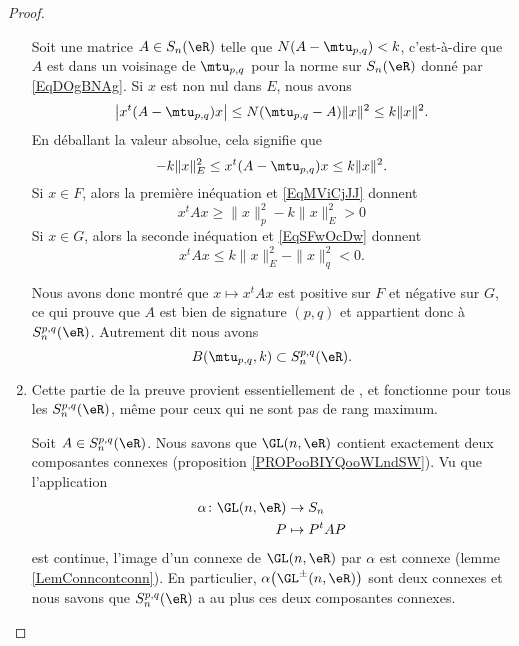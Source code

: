 \begin{proof}
\begin{enumerate}
		      Soit une matrice \( A\in S_n(\eR)\) telle que \( N(A-\mtu_{p,q})<k\), c'est-à-dire que \( A\) est dans un voisinage de \( \mtu_{p,q}\) pour la norme sur \( S_n(\eR)\) donné par \eqref{EqDOgBNAg}. Si \( x\) est non nul dans \( E\), nous avons
		      \begin{equation}
			      \big| x^t(A-\mtu_{p,q})x \big|\leq N(\mtu_{p,q}-A)\| x \|^2\leq k\| x \|^2.
		      \end{equation}
		      En déballant la valeur absolue, cela signifie que
		      \begin{equation}
			      -k\| x \|_E^2\leq x^t(A-\mtu_{p,q})x\leq k\| x \|^2.
		      \end{equation}
		      Si \( x\in F\), alors la première inéquation et \eqref{EqMViCjJJ} donnent
		      \begin{equation}
			      x^tAx\geq \| x \|_p^2-k\| x \|_E^2>0
		      \end{equation}
		      Si \( x\in G\), alors la seconde inéquation et \eqref{EqSFwOcDw} donnent
		      \begin{equation}
			      x^tAx\leq  k\| x \|_E^2-\| x \|_q^2<0.
		      \end{equation}

		      Nous avons donc montré que \( x\mapsto x^tAx\) est positive sur \( F\) et négative sur \( G\), ce qui prouve que \( A\) est bien de signature \( (p,q)\) et appartient donc à \( S_n^{p,q}(\eR)\). Autrement dit nous avons
		      \begin{equation}
			      B(\mtu_{p,q},k)\subset S_n^{p,q}(\eR).
		      \end{equation}

		\item
		      Cette partie de la preuve provient essentiellement de \cite{VKqpMYL}, et fonctionne pour tous les \( S_n^{p,q}(\eR)\), même pour ceux qui ne sont pas de rang maximum.

		      Soit \( A\in S_n^{p,q}(\eR)\). Nous savons que \( \GL(n,\eR)\) contient exactement deux composantes connexes (proposition \ref{PROPooBIYQooWLndSW}). Vu que l'application
		      \begin{equation}
			      \begin{aligned}
				      \alpha\colon \GL(n,\eR) & \to S_n       \\
				      P                       & \mapsto P^tAP
			      \end{aligned}
		      \end{equation}
		      est continue, l'image d'un connexe de \( \GL(n,\eR)\) par \( \alpha\) est connexe (lemme \ref{LemConncontconn}). En particulier, \( \alpha\big( \GL^{\pm}(n,\eR) \big)\) sont deux connexes et nous savons que \( S_n^{p,q}(\eR)\) a au plus ces deux composantes connexes.


\end{enumerate}
\end{proof}
